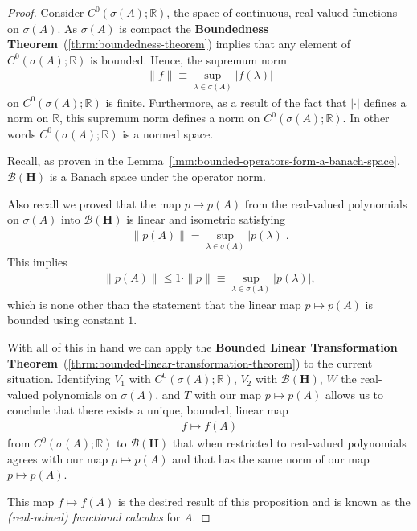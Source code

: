 \begin{proof}
Consider $C^0(\sigma(A); \mathbb{R})$, the space of continuous, real-valued functions on $\sigma(A)$. As $\sigma(A)$ is compact the \textbf{Boundedness Theorem}~(\ref{thrm:boundedness-theorem}) implies that any element of $C^0(\sigma(A); \mathbb{R})$ is bounded. Hence, the supremum norm
\begin{align}
    \|f\| \equiv \sup\limits_{\lambda \in \sigma(A)} \lvert f(\lambda) \rvert
\end{align}
on $C^0(\sigma(A); \mathbb{R})$ is finite. Furthermore, as a result of the fact that $\lvert \cdot \rvert$ defines a norm on $\mathbb{R}$, this supremum norm defines a norm on $C^0(\sigma(A); \mathbb{R})$. In other words $C^0(\sigma(A); \mathbb{R})$ is a normed space.

Recall, as proven in the Lemma~\ref{lmm:bounded-operators-form-a-banach-space}, $\mathcal{B}(\mathbf{H})$ is a Banach space under the operator norm.

Also recall we proved that the map $p \mapsto p(A)$ from the real-valued polynomials on $\sigma(A)$ into $\mathcal{B}(\mathbf{H})$ is linear and isometric satisfying
\begin{align}
    \|p(A)\| = \sup\limits_{\lambda \in \sigma(A)} \lvert p(\lambda) \rvert. 
\end{align}
This implies
\begin{align}
    \|p(A)\| \le 1 \cdot \|p\| \equiv \sup\limits_{\lambda \in \sigma(A)} \lvert p(\lambda) \rvert, 
\end{align}
which is none other than the statement that the linear map $p \mapsto p(A)$ is bounded using constant $1$.

With all of this in hand we can apply the \textbf{Bounded Linear Transformation Theorem}~(\ref{thrm:bounded-linear-transformation-theorem}) to the current situation. Identifying $V_1$ with $C^0(\sigma(A); \mathbb{R})$, $V_2$ with $\mathcal{B}(\mathbf{H})$, $W$ the real-valued polynomials on $\sigma(A)$, and $T$ with our map $p \mapsto p(A)$ allows us to conclude that there exists a unique, bounded, linear map
\begin{align}
    f \longmapsto f(A)
\end{align}
from $C^0(\sigma(A); \mathbb{R})$ to $\mathcal{B}(\mathbf{H})$ that when restricted to real-valued polynomials agrees with our map $p \mapsto p(A)$ and that has the same norm of our map $p \mapsto p(A)$.

This map $f \mapsto f(A)$ is the desired result of this proposition and is known as the \textit{(real-valued) functional calculus} for $A$.
\end{proof}

